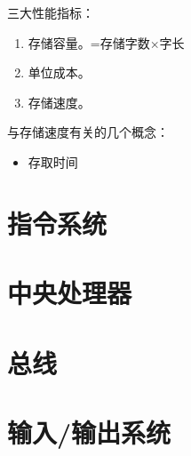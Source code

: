 \documentclass[12pt, a4paper, oneside]{ctexart}
\begin{document}
三大性能指标：
\begin{enumerate}
  \item 存储容量。=存储字数$\times$字长
  \item 单位成本。
  \item 存储速度。
\end{enumerate}

与存储速度有关的几个概念：
\begin{itemize}
  \item 存取时间
\end{itemize}

\section{指令系统}

\section{中央处理器}

\section{总线}

\section{输入/输出系统}
\end{document}
